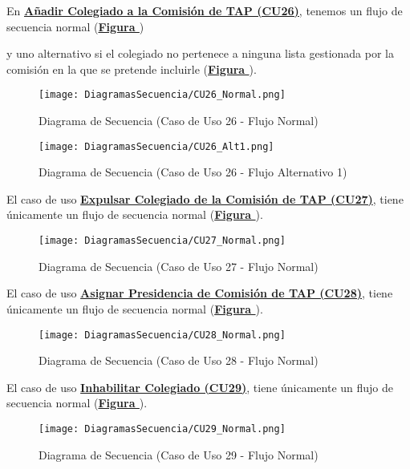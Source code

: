 \addtocounter{figura}{1}
En \textbf{\hyperref[tab:curIncluirColegComisionTAP]{Añadir Colegiado a la Comisión de TAP (CU26)}}, tenemos un flujo de secuencia normal (\textbf{\hyperref[fig:Secuencia_CU26_Normal]{Figura }}) \addtocounter{figura}{1} y uno alternativo si el colegiado no pertenece a ninguna lista gestionada por la comisión en la que se pretende incluirle (\textbf{\hyperref[fig:Secuencia_CU26_Alt1]{Figura }}).
\begin{figure}[!htbp]
  \centering
  \texttt{[image: DiagramasSecuencia/CU26\_Normal.png]}
  \caption{Diagrama de Secuencia (Caso de Uso 26 - Flujo Normal)}
  \label{fig:Secuencia_CU26_Normal}
\end{figure}
\FloatBarrier

\begin{figure}[!htbp]
  \centering
  \texttt{[image: DiagramasSecuencia/CU26\_Alt1.png]}
  \caption{Diagrama de Secuencia (Caso de Uso 26 - Flujo Alternativo 1)}
  \label{fig:Secuencia_CU26_Alt1}
\end{figure}
\FloatBarrier

\addtocounter{figura}{1}
El caso de uso \textbf{\hyperref[tab:curExpulsarColegComisionTAP]{Expulsar Colegiado de la Comisión de TAP (CU27)}}, tiene únicamente un flujo de secuencia normal (\textbf{\hyperref[fig:Secuencia_CU27_Normal]{Figura }}).
\begin{figure}[!htbp]
  \centering
  \texttt{[image: DiagramasSecuencia/CU27\_Normal.png]}
  \caption{Diagrama de Secuencia (Caso de Uso 27 - Flujo Normal)}
  \label{fig:Secuencia_CU27_Normal}
\end{figure}
\FloatBarrier

\addtocounter{figura}{1} \pagebreak
El caso de uso \textbf{\hyperref[tab:curAsignarPresidenciaComisionTAP]{Asignar Presidencia de Comisión de TAP (CU28)}}, tiene únicamente un flujo de secuencia normal (\textbf{\hyperref[fig:Secuencia_CU28_Normal]{Figura }}).
\begin{figure}[!htbp]
  \centering
  \texttt{[image: DiagramasSecuencia/CU28\_Normal.png]}
  \caption{Diagrama de Secuencia (Caso de Uso 28 - Flujo Normal)}
  \label{fig:Secuencia_CU28_Normal}
\end{figure}
\FloatBarrier

\addtocounter{figura}{1}
El caso de uso \textbf{\hyperref[tab:curInhabilitar]{Inhabilitar Colegiado (CU29)}}, tiene únicamente un flujo de secuencia normal (\textbf{\hyperref[fig:Secuencia_CU29_Normal]{Figura }}).
\begin{figure}[!htbp]
  \centering
  \texttt{[image: DiagramasSecuencia/CU29\_Normal.png]}
  \caption{Diagrama de Secuencia (Caso de Uso 29 - Flujo Normal)}
  \label{fig:Secuencia_CU29_Normal}
\end{figure}
\FloatBarrier

